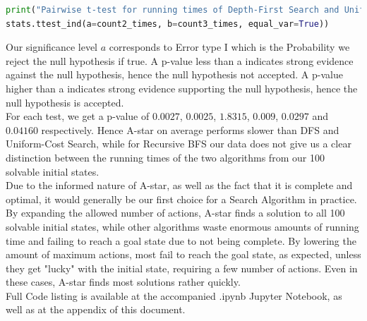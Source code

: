 \documentclass{article}
\begin{document}
\begin{lstlisting}[language=Python, caption=Example of Paired t-test between Depth-First Search and Uniform-Cost Search assuming equal variance in the distribution]
print("Pairwise t-test for running times of Depth-First Search and Uniform-Cost Search:", 
stats.ttest_ind(a=count2_times, b=count3_times, equal_var=True))

\end{lstlisting}

Our significance level $a$ corresponds to  Error type I which is the Probability we reject the null hypothesis if true. A p-value less than a indicates strong evidence against the null hypothesis, hence the null hypothesis not accepted. A p-value higher than a indicates strong evidence supporting the null hypothesis, hence the null hypothesis is accepted. \\

For each test, we get a p-value of $0.0027$, $0.0025$, $1.8315$, $0.009$, $0.0297$ and $0.04160$ respectively. Hence A-star on average performs slower than DFS and Uniform-Cost Search, while for Recursive BFS our data does not give us a clear distinction between the running times of the two algorithms from our 100 solvable initial states. \\

Due to the informed nature of A-star, as well as the fact that it is complete and optimal, it would generally be our first choice for a Search Algorithm in practice. By expanding the allowed number of actions, A-star finds a solution to all 100 solvable initial states, while other algorithms waste enormous amounts of running time and failing to reach a goal state due to not being complete. By lowering the amount of maximum actions, most fail to reach the goal state, as expected, unless they get "lucky" with the initial state, requiring a few number of actions. Even in these cases, A-star finds most solutions rather quickly. \\

Full Code listing is available at the accompanied .ipynb Jupyter Notebook, as well as at the appendix of this document.

\newpage

\appendix
\end{document}
